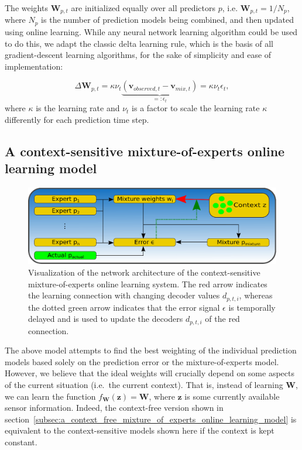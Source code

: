The weights $ \mathbf{W}_{ p ,t}$ are initialized equally over all predictors $ p$, i.e. $\mathbf{W}_{ p ,t} = 1/N_p$, where $N_p$ is the number of prediction models being combined, and then updated using online learning.
While any neural network learning algorithm could be used to do this, we adapt the classic delta learning rule, which is the basis of all gradient-descent learning algorithms, for the sake of simplicity and ease of implementation:

\begin{equation}
  \label{eq:mix_learning1}
  \Delta\mathbf{W}_{ p ,t} = \kappa \nu_{t} \underbrace{ \left(\mathbf{v}_{observed,t}-\mathbf{v}_{mix,t}\right)}_{=: \epsilon_t} = \kappa \nu_{t} \epsilon_{t}, 
\end{equation}
where $\kappa$ is the learning rate and $\nu_{t}$ is a factor to scale the learning rate $\kappa$ differently for each prediction time step.

\subsection{A context-sensitive mixture-of-experts online learning model}%
\label{subsec:a_context_sensitive_mixture_of_experts_online_learning_model}

\begin{figure}[t!]
    \centering
    \includegraphics[width=\textwidth]{imgs/mix_system_arch.eps}
    \caption{Visualization of the network architecture of the context-sensitive mixture-of-experts online learning system.
    The red arrow indicates the learning connection with changing decoder values $d_{p,t,i}$, whereas the dotted green arrow indicates that the error signal $\epsilon$ is temporally delayed and is used to update the decoders $d_{p,t,i}$ of the red connection.}
    \label{fig:mix_context_sensitive_system_arch}
\end{figure}

The above model attempts to find the best weighting of the individual prediction models based solely on the prediction error or the mixture-of-experts model.
However, we believe that the ideal weights will crucially depend on some aspects of the current situation (i.e.\ the current context).
That is, instead of learning $ \mathbf{W}$, we can learn the function $f_{ \mathbf{W}}( \mathbf{z})= \mathbf{W}$, where $\mathbf{z}$ is some currently available sensor information.
Indeed, the context-free version shown in section~\ref{subsec:a_context_free_mixture_of_experts_online_learning_model} is equivalent to the context-sensitive models shown here if the context is kept constant.

